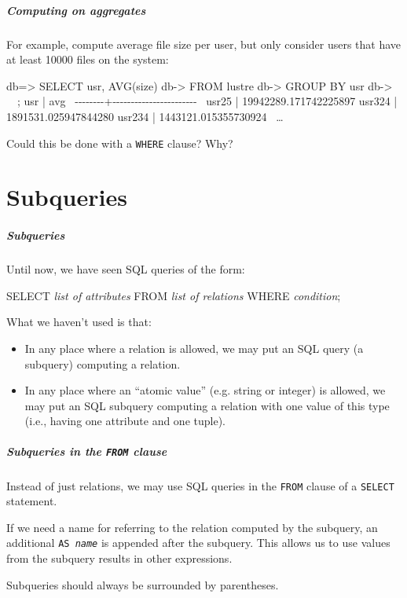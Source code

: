 \documentclass[english,serif,mathserif]{beamer}
\begin{document}
\begin{frame}[fragile]
  \frametitle{Computing on aggregates}

  For example, compute average file size per user, but only consider users that
  have at least 10000 files on the system:
  \begin{sql}
 db=> SELECT usr, AVG(size)
 db-> FROM lustre
 db-> GROUP BY usr
 db-> ~~;
  usr   |          avg
~-{}-{}-{}-{}-{}-{}-{}-{}+{}-{}-{}-{}-{}-{}-{}-{}-{}-{}-{}-{}-{}-{}-{}-{}-{}-{}-{}-{}-{}-{}-{}-{}~
 usr25  | 19942289.171742225897
 usr324 |  1891531.025947844280
 usr234 |  1443121.015355730924
 ~{\ldots}~
\end{sql}

  \+
  \alert{Could this be done with a \texttt{WHERE} clause?  Why?}
\end{frame}


\part{Subqueries}
\begin{frame}[fragile]
  \frametitle{Subqueries}
  \small

  Until now, we have seen SQL queries of the form:
\begin{semiverbatim}
SELECT \emph{list of attributes}
FROM \emph{list of relations}
WHERE \emph{condition};
\end{semiverbatim}

  \+
  What we haven’t used is that:
  \begin{itemize}
  \item In any place where a relation is allowed, we may put an SQL query (a
    subquery) computing a relation.
  \item In any place where an “atomic value” (e.g. string or integer) is
    allowed, we may put an SQL subquery computing a relation with one value of
    this type (i.e., having one attribute and one tuple).
  \end{itemize}
\end{frame}


\begin{frame}
  \frametitle{Subqueries in the \texttt{FROM} clause}
  Instead of just relations, we may use SQL queries in the \texttt{FROM} clause of
  a \texttt{SELECT} statement.

  \+
  If we need a name for referring to the relation computed by the subquery, an
  additional \texttt{AS \emph{name}} is appended after the subquery.
  This allows us to use values from the subquery results in other expressions.

  \+
  Subqueries should always be surrounded by parentheses.
\end{frame}
\end{document}
